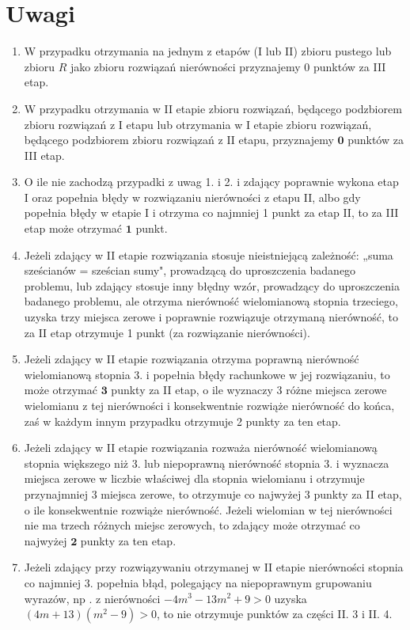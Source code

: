 \documentclass[10pt]{article}
\begin{document}
\section*{Uwagi}
\begin{enumerate}
  \item W przypadku otrzymania na jednym z etapów (I lub II) zbioru pustego lub zbioru $R$ jako zbioru rozwiązań nierówności przyznajemy 0 punktów za III etap.
  \item W przypadku otrzymania w II etapie zbioru rozwiązań, będącego podzbiorem zbioru rozwiązań z I etapu lub otrzymania w I etapie zbioru rozwiązań, będącego podzbiorem zbioru rozwiązań z II etapu, przyznajemy $\mathbf{0}$ punktów za III etap.
  \item O ile nie zachodzą przypadki z uwag 1. i 2. i zdający poprawnie wykona etap I oraz popełnia błędy w rozwiązaniu nierówności z etapu II, albo gdy popełnia błędy w etapie I i otrzyma co najmniej 1 punkt za etap II, to za III etap może otrzymać $\mathbf{1}$ punkt.
  \item Jeżeli zdający w II etapie rozwiązania stosuje nieistniejącą zależność: „suma sześcianów = sześcian sumy", prowadzącą do uproszczenia badanego problemu, lub zdający stosuje inny błędny wzór, prowadzący do uproszczenia badanego problemu, ale otrzyma nierówność wielomianową stopnia trzeciego, uzyska trzy miejsca zerowe i poprawnie rozwiązuje otrzymaną nierówność, to za II etap otrzymuje 1 punkt (za rozwiązanie nierówności).
  \item Jeżeli zdający w II etapie rozwiązania otrzyma poprawną nierówność wielomianową stopnia 3. i popełnia błędy rachunkowe w jej rozwiązaniu, to może otrzymać $\mathbf{3}$ punkty za II etap, o ile wyznaczy 3 różne miejsca zerowe wielomianu z tej nierówności i konsekwentnie rozwiąże nierówność do końca, zaś w każdym innym przypadku otrzymuje 2 punkty za ten etap.
  \item Jeżeli zdający w II etapie rozwiązania rozważa nierówność wielomianową stopnia większego niż 3. lub niepoprawną nierówność stopnia 3. i wyznacza miejsca zerowe w liczbie właściwej dla stopnia wielomianu i otrzymuje przynajmniej 3 miejsca zerowe, to otrzymuje co najwyżej 3 punkty za II etap, o ile konsekwentnie rozwiąże nierówność. Jeżeli wielomian w tej nierówności nie ma trzech różnych miejsc zerowych, to zdający może otrzymać co najwyżej $\mathbf{2}$ punkty za ten etap.
  \item Jeżeli zdający przy rozwiązywaniu otrzymanej w II etapie nierówności stopnia co najmniej 3. popełnia błąd, polegający na niepoprawnym grupowaniu wyrazów, np . z nierówności $-4 m^{3}-13 m^{2}+9>0$ uzyska $(4 m+13)\left(m^{2}-9\right)>0$, to nie otrzymuje punktów za części II. 3 i II. 4.
\end{enumerate}
\end{document}
